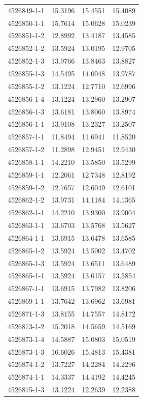 \begin{longtable}{lrrr}
4526849-1-1 & 15.3196 & 15.4551 & 15.4089 \\
4526850-1-1 & 15.7614 & 15.0628 & 15.0239 \\
4526851-1-2 & 12.8992 & 13.4187 & 13.4585 \\
4526852-1-2 & 13.5924 & 13.0195 & 12.9705 \\
4526852-1-3 & 13.9766 & 13.8463 & 13.8827 \\
4526855-1-3 & 14.5495 & 14.0048 & 13.9787 \\
4526855-1-2 & 13.1224 & 12.7710 & 12.6996 \\
4526856-1-4 & 13.1224 & 13.2960 & 13.2907 \\
4526856-1-3 & 13.6181 & 13.8060 & 13.8974 \\
4526856-1-1 & 13.9108 & 13.2327 & 13.2507 \\
4526857-1-1 & 11.8494 & 11.6941 & 11.8520 \\
4526857-1-2 & 11.2898 & 12.9451 & 12.9430 \\
4526858-1-1 & 14.2210 & 13.5850 & 13.5299 \\
4526859-1-1 & 12.2061 & 12.7348 & 12.8192 \\
4526859-1-2 & 12.7657 & 12.6049 & 12.6101 \\
4526862-1-2 & 13.9731 & 14.1184 & 14.1365 \\
4526862-1-1 & 14.2210 & 13.9300 & 13.9004 \\
4526863-1-1 & 13.6703 & 13.5768 & 13.5627 \\
4526864-1-1 & 13.6915 & 13.6478 & 13.6585 \\
4526865-1-2 & 13.5924 & 13.5002 & 13.4702 \\
4526865-1-3 & 13.5924 & 13.6511 & 13.6489 \\
4526865-1-1 & 13.5924 & 13.6157 & 13.5854 \\
4526867-1-1 & 13.6915 & 13.7982 & 13.8206 \\
4526869-1-1 & 13.7642 & 13.6962 & 13.6981 \\
4526871-1-3 & 13.8155 & 14.7557 & 14.8172 \\
4526873-1-2 & 15.2018 & 14.5659 & 14.5169 \\
4526873-1-4 & 14.5887 & 15.0803 & 15.0519 \\
4526873-1-3 & 16.6026 & 15.4813 & 15.4381 \\
4526874-1-2 & 13.7227 & 14.2284 & 14.2296 \\
4526874-1-1 & 14.3337 & 14.4192 & 14.4245 \\
4526875-1-3 & 13.1224 & 12.2639 & 12.2388 \\

\end{longtable}
